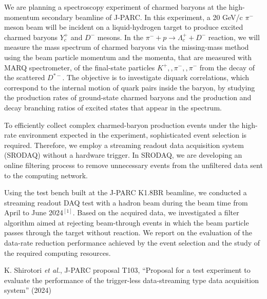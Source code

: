 \documentclass{snpyrs}
\begin{document}
We are planning a spectroscopy experiment of charmed baryons at the high-momentum secondary beamline of J-PARC. In this experiment, a 20 GeV/c $\pi^-$ meson beam will be incident on a liquid-hydrogen target to produce excited charmed baryons $Y_c^{+}$ and $D^{-}$ mesons. In the $\pi^- + p \rightarrow \Lambda_c^{+} + D^{-}$ reaction, we will measure the mass spectrum of charmed baryons via the missing-mass method using the beam particle momentum and the momenta, that are measured with MARQ spectrometer, of the final-state particles $K^+,,\pi^-,,\pi^-$ from the decay of the scattered $D^{*-}$. The objective is to investigate diquark correlations, which correspond to the internal motion of quark pairs inside the baryon, by studying the production rates of ground-state charmed baryons and the production and decay branching ratios of excited states that appear in the spectrum.

To efficiently collect complex charmed-baryon production events under the high-rate environment expected in the experiment, sophisticated event selection is required. Therefore, we employ a streaming readout data acquisition system (SRODAQ) without a hardware trigger. In SRODAQ, we are developing an online filtering process to remove unnecessary events from the unfiltered data sent to the computing network.

Using the test bench built at the J-PARC K1.8BR beamline, we conducted a streaming readout DAQ test with a hadron beam during the beam time from April to June 2024$^{[1]}$. Based on the acquired data, we investigated a filter algorithm aimed at rejecting beam-through events in which the beam particle passes through the target without reaction. We report on the evaluation of the data-rate reduction performance achieved by the event selection and the study of the required computing resources.



\begin{thebibliography}{9}
%
\vspace*{-0.2cm}
K. Shirotori \textit{et al.}, J-PARC proposal T103, “Proposal for a test experiment to evaluate the performance of the trigger-less data-streaming type data acquisition system” (2024)

\vspace*{-0.2cm}

\end{thebibliography}
\end{document}
